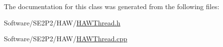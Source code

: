 The documentation for this class was generated from the following files\-:\begin{DoxyCompactItemize}
\item 
Software/\-S\-E2\-P2/\-H\-A\-W/\hyperlink{_h_a_w_thread_8h}{H\-A\-W\-Thread.\-h}\item 
Software/\-S\-E2\-P2/\-H\-A\-W/\hyperlink{_h_a_w_thread_8cpp}{H\-A\-W\-Thread.\-cpp}\end{DoxyCompactItemize}
